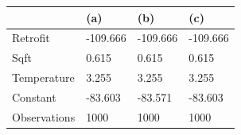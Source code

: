 \begin{tabular}{llll}
\toprule
 & (a) & (b) & (c) \\
\midrule
Retrofit & -109.666 & -109.666 & -109.666 \\
Sqft & 0.615 & 0.615 & 0.615 \\
Temperature & 3.255 & 3.255 & 3.255 \\
Constant & -83.603 & -83.571 & -83.603 \\
Observations & 1000 & 1000 & 1000 \\
\bottomrule
\end{tabular}
